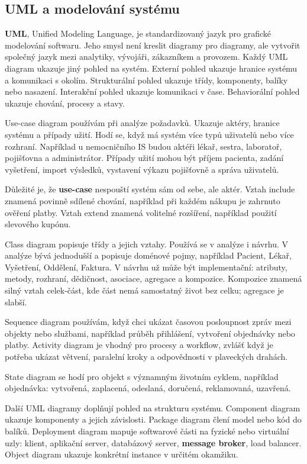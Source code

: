 \subsection*{UML a modelování systému}

\textbf{UML}, Unified Modeling Language, je standardizovaný jazyk pro grafické modelování softwaru. Jeho smysl není kreslit diagramy pro diagramy, ale vytvořit společný jazyk mezi analytiky, vývojáři, zákazníkem a provozem. Každý UML diagram ukazuje jiný pohled na systém. Externí pohled ukazuje hranice systému a komunikaci s okolím. Strukturální pohled ukazuje třídy, komponenty, balíky nebo nasazení. Interakční pohled ukazuje komunikaci v čase. Behaviorální pohled ukazuje chování, procesy a stavy.

Use-case diagram používám při analýze požadavků. Ukazuje aktéry, hranice systému a případy užití. Hodí se, když má systém více typů uživatelů nebo více rozhraní. Například u nemocničního IS budou aktéři lékař, sestra, laboratoř, pojišťovna a administrátor. Případy užití mohou být příjem pacienta, zadání vyšetření, import výsledků, vystavení výkazu pojišťovně a správa uživatelů.

Důležité je, že \textbf{use-case} nespouští systém sám od sebe, ale aktér. Vztah include znamená povinně sdílené chování, například při každém nákupu je zahrnuto ověření platby. Vztah extend znamená volitelné rozšíření, například použití slevového kupónu.

Class diagram popisuje třídy a jejich vztahy. Používá se v analýze i návrhu. V analýze bývá jednodušší a popisuje doménové pojmy, například Pacient, Lékař, Vyšetření, Oddělení, Faktura. V návrhu už může být implementační: atributy, metody, rozhraní, dědičnost, asociace, agregace a kompozice. Kompozice znamená silný vztah celek-část, kde část nemá samostatný život bez celku; agregace je slabší.

Sequence diagram používám, když chci ukázat časovou posloupnost zpráv mezi objekty nebo službami, například průběh přihlášení, vytvoření objednávky nebo platby. Activity diagram je vhodný pro procesy a workflow, zvlášť když je potřeba ukázat větvení, paralelní kroky a odpovědnosti v plaveckých drahách.

State diagram se hodí pro objekt s významným životním cyklem, například objednávka: vytvořená, zaplacená, odeslaná, doručená, reklamovaná, uzavřená.

Další UML diagramy doplňují pohled na strukturu systému. Component diagram ukazuje komponenty a jejich závislosti. Package diagram člení model nebo kód do balíků. Deployment diagram mapuje softwarové části na fyzické nebo virtuální uzly: klient, aplikační server, databázový server, \textbf{message broker}, load balancer. Object diagram ukazuje konkrétní instance v určitém okamžiku.

